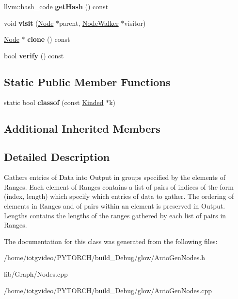 \begin{DoxyCompactItemize}
\mbox{\label{classglow_1_1_gather_ranges_node_a4b15bedb8a90977233863042fb8a1d2a}} 
llvm\+::hash\+\_\+code {\bfseries get\+Hash} () const
\item 
\mbox{\label{classglow_1_1_gather_ranges_node_a5552270a978ae9518c2ede52c992b197}} 
void {\bfseries visit} (\hyperlink{classglow_1_1_node}{Node} $\ast$parent, \hyperlink{classglow_1_1_node_walker}{Node\+Walker} $\ast$visitor)
\item 
\mbox{\label{classglow_1_1_gather_ranges_node_abeefedf16a2e1b7689b6b9d362f853dc}} 
\hyperlink{classglow_1_1_node}{Node} $\ast$ {\bfseries clone} () const
\item 
\mbox{\label{classglow_1_1_gather_ranges_node_a0a74f0f1780c0caed257c7e5261a092b}} 
bool {\bfseries verify} () const
\end{DoxyCompactItemize}
\subsection*{Static Public Member Functions}
\begin{DoxyCompactItemize}
\item 
\mbox{\label{classglow_1_1_gather_ranges_node_a53be143e257f19f5e041d40e1b23090f}} 
static bool {\bfseries classof} (const \hyperlink{classglow_1_1_kinded}{Kinded} $\ast$k)
\end{DoxyCompactItemize}
\subsection*{Additional Inherited Members}


\subsection{Detailed Description}
Gathers entries of Data into Output in groups specified by the elements of Ranges. Each element of Ranges contains a list of pairs of indices of the form (index, length) which specify which entries of data to gather. The ordering of elements in Ranges and of pairs within an element is preserved in Output. Lengths contains the lengths of the ranges gathered by each list of pairs in Ranges. 

The documentation for this class was generated from the following files\+:\begin{DoxyCompactItemize}
\item 
/home/iotgvideo/\+P\+Y\+T\+O\+R\+C\+H/build\+\_\+\+Debug/glow/Auto\+Gen\+Nodes.\+h\item 
lib/\+Graph/Nodes.\+cpp\item 
/home/iotgvideo/\+P\+Y\+T\+O\+R\+C\+H/build\+\_\+\+Debug/glow/Auto\+Gen\+Nodes.\+cpp\end{DoxyCompactItemize}
